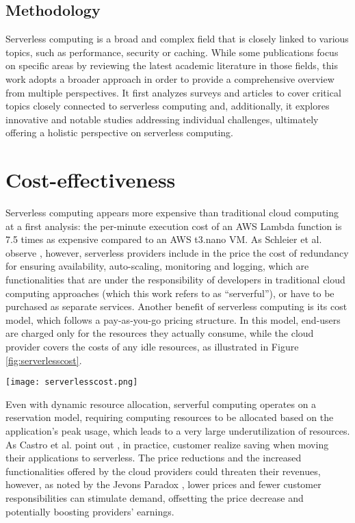 \documentclass[
	a4paper, %
	12pt,
	twoside, %
]{LTJournalArticle}
\begin{document}
\subsection{Methodology}
Serverless computing is a broad and complex field that is closely linked to various topics, such as performance, security or caching. While some publications focus on specific areas by reviewing the latest academic literature in those fields, this work adopts a broader approach in order to provide a comprehensive overview from multiple perspectives. It first analyzes surveys and articles to cover critical topics closely connected to serverless computing and, additionally, it explores innovative and notable studies addressing individual challenges, ultimately offering a holistic perspective on serverless computing.

\section{Cost-effectiveness}
\label{sec:costeffectiveness}
Serverless computing appears more expensive than traditional cloud computing at a first analysis: the per-minute execution cost of an AWS Lambda function is 7.5 times as expensive compared to an AWS t3.nano VM. As Schleier et al. observe \cite{schleier-smith_what_2021}, however, serverless providers include in the price the cost of redundancy for ensuring availability, auto-scaling, monitoring and logging, which are functionalities that are under the responsibility of developers in traditional cloud computing approaches (which this work refers to as ``serverful''), or have to be purchased as separate services.
Another benefit of serverless computing is its cost model, which follows a pay-as-you-go pricing structure. In this model, end-users are charged only for the resources they actually consume, while the cloud provider covers the costs of any idle resources, as illustrated in Figure \ref{fig:serverlesscost}.
\begin{figure*}
	\texttt{[image: serverlesscost.png]}
	\caption{Advantages of serverless computing's cost model. Source: \cite{schleier-smith_what_2021}}
	\label{fig:serverlesscost}
\end{figure*}
Even with dynamic resource allocation, serverful computing operates on a reservation model, requiring computing resources to be allocated based on the application's peak usage, which leads to a very large underutilization of resources. As Castro et al. point out \cite{schleier-smith_what_2021}, in practice, customer realize saving when moving their applications to serverless. The price reductions and the increased functionalities offered by the cloud providers could threaten their revenues, however, as noted by the Jevons Paradox \cite{alcott_jevons_2005}, lower prices and fewer customer responsibilities can stimulate demand, offsetting the price decrease and potentially boosting providers’ earnings. 
\end{document}
